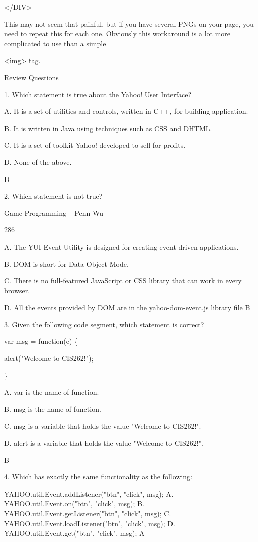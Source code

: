 \documentclass[
]{article}
\begin{document}
\textless/DIV\textgreater{}

This may not seem that painful, but if you have several PNGs on your
page, you need to repeat this for each one. Obviously this workaround is
a lot more complicated to use than a simple

\textless img\textgreater{} tag.

Review Questions

1. Which statement is true about the Yahoo! User Interface?

A. It is a set of utilities and controls, written in C++, for building
application.

B. It is written in Java using techniques such as CSS and DHTML.

C. It is a set of toolkit Yahoo! developed to sell for profits.

D. None of the above.

D

2. Which statement is not true?

Game Programming -- Penn Wu

286

\protect\hypertarget{index_split_015.htmlux5cux23p287}{}{}A. The YUI
Event Utility is designed for creating event-driven applications.

B. DOM is short for Data Object Mode.

C. There is no full-featured JavaScript or CSS library that can work in
every browser.

D. All the events provided by DOM are in the yahoo-dom-event.js library
file B

3. Given the following code segment, which statement is correct?

var msg = function(e) \{

alert("Welcome to CIS262!");

\}

A. var is the name of function.

B. msg is the name of function.

C. msg is a variable that holds the value "Welcome to CIS262!".

D. alert is a variable that holds the value "Welcome to CIS262!".

B

4. Which has exactly the same functionality as the following:

YAHOO.util.Event.addListener("btn", "click", msg); A.
YAHOO.util.Event.on("btn", "click", msg); B.
YAHOO.util.Event.getListener("btn", "click", msg); C.
YAHOO.util.Event.loadListener("btn", "click", msg); D.
YAHOO.util.Event.get("btn", "click", msg); A
\end{document}
